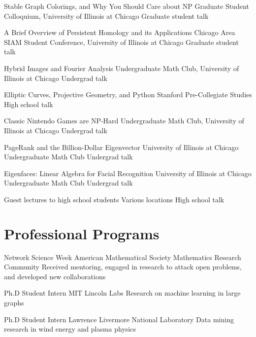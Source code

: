 \documentclass[11pt]{moderncv}
\begin{document}
         {Stable Graph Colorings, and Why You Should Care about NP}
      {Graduate Student Colloquium, University of Illinois at Chicago}
      {Graduate student talk}
      {}
      {}

         {A Brief Overview of Persistent Homology and its Applications}
      {Chicago Area SIAM Student Conference, University of Illinois at Chicago}
      {Graduate student talk}
      {}
      {}

         {Hybrid Images and Fourier Analysis}
      {Undergraduate Math Club, University of Illinois at Chicago}
      {Undergrad talk}
      {}
      {}

         {Elliptic Curves, Projective Geometry, and Python}
      {Stanford Pre-Collegiate Studies}
      {High school talk}
      {}
      {}

         {Classic Nintendo Games are NP-Hard}
      {Undergraduate Math Club, University of Illinois at Chicago}
      {Undergrad talk}
      {}
      {}

         {PageRank and the Billion-Dollar Eigenvector}
      {University of Illinois at Chicago Undergraduate Math Club}
      {Undergrad talk}
      {}
      {}

         {Eigenfaces: Linear Algebra for Facial Recognition}
      {University of Illinois at Chicago Undergraduate Math Club}
      {Undergrad talk}
      {}
      {}

         {Guest lectures to high school students}
      {Various locations}
      {High school talk}
      {}
      {}


   \section{Professional Programs}
         {Network Science Week}
      {American Mathematical Society Mathematics Research Community}
      {Received mentoring, engaged in research to attack open problems, and developed new collaborations}
      {}
      {}

         {Ph.D Student Intern}
      {MIT Lincoln Labs}
      {Research on machine learning in large graphs}
      {}
      {}

         {Ph.D Student Intern}
      {Lawrence Livermore National Laboratory}
      {Data mining research in wind energy and plasma physics}
      {}
      {}
\end{document}
